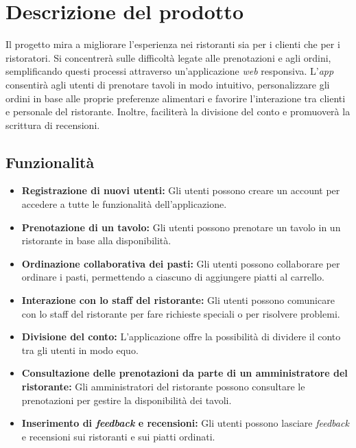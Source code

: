 \section{Descrizione del prodotto}
Il progetto mira a migliorare l'esperienza nei ristoranti sia per i clienti che per i ristoratori.
Si concentrerà sulle difficoltà legate alle prenotazioni e agli ordini, semplificando questi processi attraverso un'applicazione \textit{web} responsiva.
L'\textit{app} consentirà agli utenti di prenotare tavoli in modo intuitivo, personalizzare gli ordini in base alle proprie preferenze alimentari e favorire l'interazione tra clienti e personale del ristorante.
Inoltre, faciliterà la divisione del conto e promuoverà la scrittura di recensioni.

\subsection{Funzionalità}

\begin{itemize}
	\item \textbf{Registrazione di nuovi utenti:} Gli utenti possono creare un account per accedere a tutte le funzionalità dell'applicazione.
	\item \textbf{Prenotazione di un tavolo:} Gli utenti possono prenotare un tavolo in un ristorante in base alla disponibilità.
	\item \textbf{Ordinazione collaborativa dei pasti:} Gli utenti possono collaborare per ordinare i pasti, permettendo a ciascuno di aggiungere piatti al carrello.
	\item \textbf{Interazione con lo staff del ristorante:} Gli utenti possono comunicare con lo staff del ristorante per fare richieste speciali o per risolvere problemi.
	\item \textbf{Divisione del conto:} L'applicazione offre la possibilità di dividere il conto tra gli utenti in modo equo.
	\item \textbf{Consultazione delle prenotazioni da parte di un amministratore del ristorante:} Gli amministratori del ristorante possono consultare le prenotazioni per gestire la disponibilità dei tavoli.
	\item \textbf{Inserimento di \textit{feedback} e recensioni:} Gli utenti possono lasciare \textit{feedback} e recensioni sui ristoranti e sui piatti ordinati.
\end{itemize}

